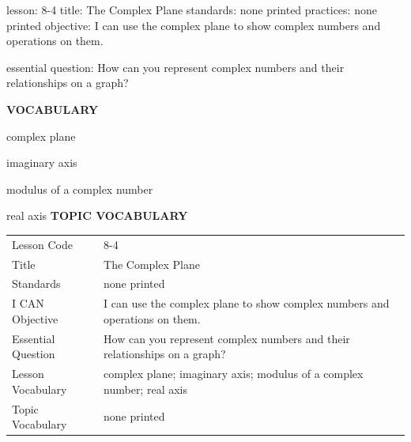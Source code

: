 \documentclass{article}
\newenvironment{lesson-meta}{}{}        %
\newcommand{\te}[1]{}                   %
\begin{document}
\begin{lesson-meta}
lesson: 8-4
title: The Complex Plane
standards: none printed
practices: none printed
objective: I can use the complex plane to show complex numbers and operations on them.

essential question: How can you represent complex numbers and their relationships on a graph?

\textbf{VOCABULARY}
\item complex plane
\item imaginary axis
\item modulus of a complex number
\item real axis
\textbf{TOPIC VOCABULARY}
\te{No topic vocabulary list is printed on these pages.}
\begin{tabular}{ll}
Lesson Code & 8-4 \\
Title & The Complex Plane \\
Standards & none printed \\
I CAN Objective & I can use the complex plane to show complex numbers and operations on them. \\
Essential Question & How can you represent complex numbers and their relationships on a graph? \\
Lesson Vocabulary & complex plane; imaginary axis; modulus of a complex number; real axis \\
Topic Vocabulary & none printed \\
\end{tabular}
\end{lesson-meta}
\end{document}
